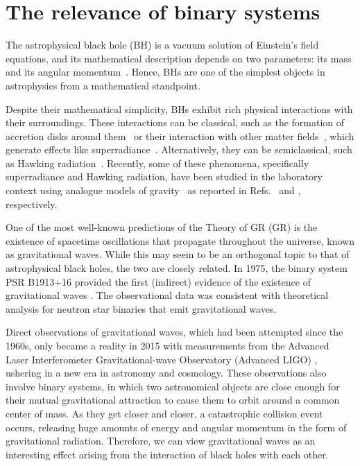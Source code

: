 \section{The relevance of binary systems}

The astrophysical black hole (\ac{BH}) is a vacuum solution of Einstein's field equations, and its mathematical description depends on two parameters: its mass and its angular momentum~\cite{1986bhmp.book.....T}. Hence, \acp{BH} are one of the simplest objects in astrophysics from a mathematical standpoint.

Despite their mathematical simplicity, \acp{BH} exhibit rich physical interactions with their surroundings. These interactions can be classical, such as the formation of accretion disks around them~\cite{Abramowicz2013} or their interaction with other matter fields~\cite{Ficarra2023}, which generate effects like superradiance~\cite{PhysRevD.87.043513}. Alternatively, they can be semiclassical, such as Hawking radiation~\cite{Wald2001}. Recently, some of these phenomena, specifically superradiance and Hawking radiation, have been studied in the laboratory context using analogue models of gravity~\cite{Barcel2011} as reported in Refs.~\cite{Torres2017} and \cite{Kolobov2021}, respectively.

One of the most well-known predictions of the Theory of \ac{GR} (\ac{GR}) is the existence of spacetime oscillations that propagate throughout the universe, known as gravitational waves. While this may seem to be an orthogonal topic to that of astrophysical black holes, the two are closely related. In 1975, the binary system PSR B1913$+$16 provided the first (indirect) evidence of the existence of gravitational waves \cite{1975ApJ...195L..51H}. The observational data was consistent with theoretical analysis for neutron star binaries that emit gravitational waves.

Direct observations of gravitational waves, which had been attempted since the 1960s, only became a reality in 2015 with measurements from the Advanced Laser Interferometer Gravitational-wave Observatory (Advanced LIGO) \cite{grav1,grav2}, ushering in a new era in astronomy and cosmology. These observations also involve binary systems, in which two astronomical objects are close enough for their mutual gravitational attraction to cause them to orbit around a common center of mass. As they get closer and closer, a catastrophic collision event occurs, releasing huge amounts of energy and angular momentum in the form of gravitational radiation. Therefore, we can view gravitational waves as an interesting effect arising from the interaction of black holes with each other.

